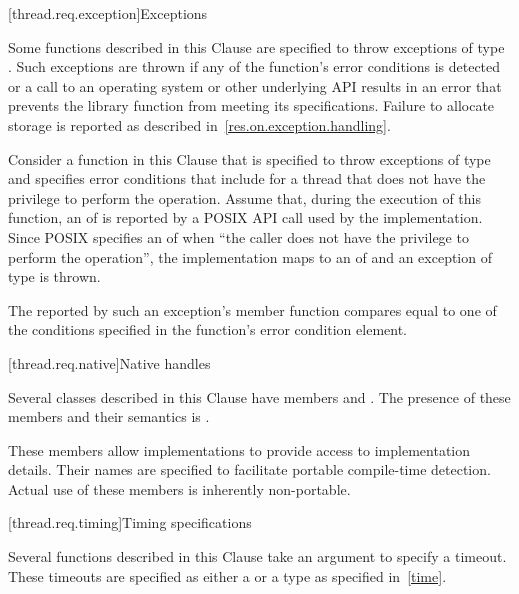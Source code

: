 [thread.req.exception]{Exceptions}

\pnum
Some functions described in this Clause are specified to throw exceptions of type
. Such exceptions are thrown if
any of the function's error conditions is detected or
a call to
an operating system or other underlying API results in an error that prevents the
library function from
meeting its specifications. Failure to allocate storage is reported as described
in~\ref{res.on.exception.handling}.

\begin{example}
Consider a function in this Clause that is specified to throw exceptions of type
 and specifies error conditions that include
 for a thread that does not have the privilege to
perform the operation. Assume that, during the execution of this function, an 
of  is reported by a POSIX API call used by the implementation. Since POSIX
specifies an  of  when ``the caller does not have the privilege
to perform the operation'', the implementation maps  to an
 of  and an exception
of type  is thrown.
\end{example}

\pnum
The  reported by such an exception's  member function
compares equal to one of the conditions specified in the function's error condition
element.

[thread.req.native]{Native handles}

\pnum
Several classes described in this Clause have members  and
. The presence of these members and their semantics is
.
\begin{note}
These members allow implementations to provide access
to implementation details. Their names are specified to facilitate portable compile-time
detection. Actual use of these members is inherently non-portable.
\end{note}

[thread.req.timing]{Timing specifications}

\pnum
Several functions described in this Clause take an argument to specify a timeout. These
timeouts are specified as either a  or a  type as
specified in~\ref{time}.

